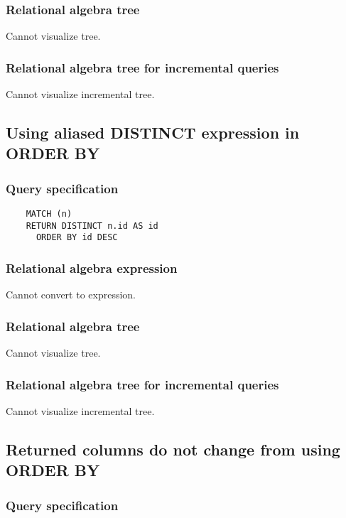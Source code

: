 	\subsubsection*{Relational algebra tree}

	Cannot visualize tree.

	\subsubsection*{Relational algebra tree for incremental queries}

	Cannot visualize incremental tree.
	\subsection{Using aliased DISTINCT expression in ORDER BY}

	\subsubsection*{Query specification}

	\begin{lstlisting}
	MATCH (n)
	RETURN DISTINCT n.id AS id
	  ORDER BY id DESC
	\end{lstlisting}


	\subsubsection*{Relational algebra expression}

	Cannot convert to expression.

	\subsubsection*{Relational algebra tree}

	Cannot visualize tree.

	\subsubsection*{Relational algebra tree for incremental queries}

	Cannot visualize incremental tree.
	\subsection{Returned columns do not change from using ORDER BY}

	\subsubsection*{Query specification}

